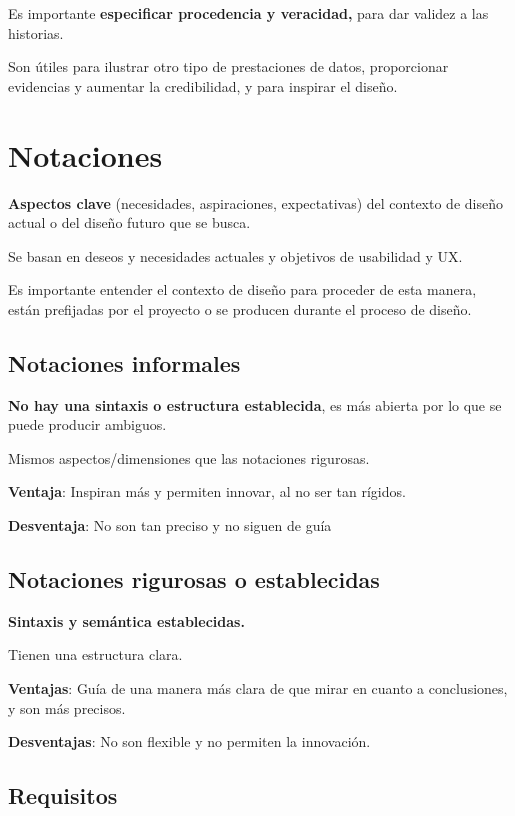 \documentclass[12pt]{report} %
\begin{document}
Es importante \textbf{especificar procedencia y veracidad,} para dar
validez a las historias.

Son útiles para ilustrar otro tipo de prestaciones de datos,
proporcionar evidencias y aumentar la credibilidad, y para inspirar el
diseño.

\section{Notaciones}

\textbf{Aspectos clave} (necesidades, aspiraciones, expectativas) del
contexto de diseño actual o del diseño futuro que se busca.

Se basan en deseos y necesidades actuales y objetivos de usabilidad y
UX.

Es importante entender el contexto de diseño para proceder de esta
manera, están prefijadas por el proyecto o se producen durante el
proceso de diseño.

\subsection{Notaciones informales}

\textbf{No hay una sintaxis o estructura establecida}, es más abierta
por lo que se puede producir ambiguos.

Mismos aspectos/dimensiones que las notaciones rigurosas.

\textbf{Ventaja}: Inspiran más y permiten innovar, al no ser tan
rígidos.

\textbf{Desventaja}: No son tan preciso y no siguen de guía

\subsection{Notaciones rigurosas o establecidas}

\textbf{Sintaxis y semántica establecidas.}

Tienen una estructura clara.

\textbf{Ventajas}: Guía de una manera más clara de que mirar en cuanto a
conclusiones, y son más precisos.

\textbf{Desventajas}: No son flexible y no permiten la innovación.

\subsection{Requisitos}
\end{document}
